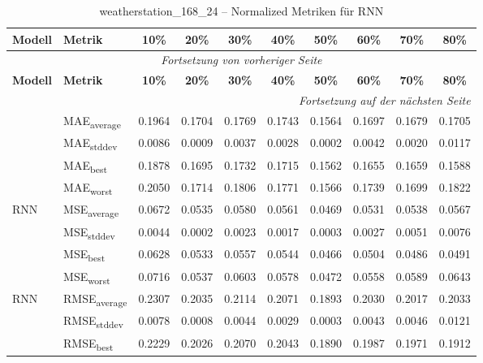 {\small
\begin{longtable}{l l c c c c c c c c}
    \toprule
    \textbf{Modell} & \textbf{Metrik} & \textbf{10\%} & \textbf{20\%} & \textbf{30\%} & \textbf{40\%} & \textbf{50\%} & \textbf{60\%} & \textbf{70\%} & \textbf{80\%} \\
    \midrule
    \endfirsthead
    \multicolumn{10}{c}{\textit{Fortsetzung von vorheriger Seite}} \\
    \toprule
    \textbf{Modell} & \textbf{Metrik} & \textbf{10\%} & \textbf{20\%} & \textbf{30\%} & \textbf{40\%} & \textbf{50\%} & \textbf{60\%} & \textbf{70\%} & \textbf{80\%} \\
    \midrule
    \endhead
    \midrule
    \multicolumn{10}{r}{\textit{Fortsetzung auf der nächsten Seite}} \\
    \midrule
    \endfoot
    \bottomrule
    \caption{weatherstation_168_24 -- Normalized Metriken für RNN}
    \label{tab:weatherstation_168_24_normalized_rnn}
    \endlastfoot
\multirow{4}{*}{RNN} & MAE\textsubscript{average} & 0.1964 & 0.1704 & 0.1769 & 0.1743 & 0.1564 & 0.1697 & 0.1679 & 0.1705 \\
 & MAE\textsubscript{stddev} & 0.0086 & 0.0009 & 0.0037 & 0.0028 & 0.0002 & 0.0042 & 0.0020 & 0.0117 \\
 & MAE\textsubscript{best} & 0.1878 & 0.1695 & 0.1732 & 0.1715 & 0.1562 & 0.1655 & 0.1659 & 0.1588 \\
 & MAE\textsubscript{worst} & 0.2050 & 0.1714 & 0.1806 & 0.1771 & 0.1566 & 0.1739 & 0.1699 & 0.1822 \\
\cmidrule(lr){2-10}
\multirow{4}{*}{RNN} & MSE\textsubscript{average} & 0.0672 & 0.0535 & 0.0580 & 0.0561 & 0.0469 & 0.0531 & 0.0538 & 0.0567 \\
 & MSE\textsubscript{stddev} & 0.0044 & 0.0002 & 0.0023 & 0.0017 & 0.0003 & 0.0027 & 0.0051 & 0.0076 \\
 & MSE\textsubscript{best} & 0.0628 & 0.0533 & 0.0557 & 0.0544 & 0.0466 & 0.0504 & 0.0486 & 0.0491 \\
 & MSE\textsubscript{worst} & 0.0716 & 0.0537 & 0.0603 & 0.0578 & 0.0472 & 0.0558 & 0.0589 & 0.0643 \\
\cmidrule(lr){2-10}
\multirow{4}{*}{RNN} & RMSE\textsubscript{average} & 0.2307 & 0.2035 & 0.2114 & 0.2071 & 0.1893 & 0.2030 & 0.2017 & 0.2033 \\
 & RMSE\textsubscript{stddev} & 0.0078 & 0.0008 & 0.0044 & 0.0029 & 0.0003 & 0.0043 & 0.0046 & 0.0121 \\
 & RMSE\textsubscript{best} & 0.2229 & 0.2026 & 0.2070 & 0.2043 & 0.1890 & 0.1987 & 0.1971 & 0.1912 \\

\end{longtable}}
